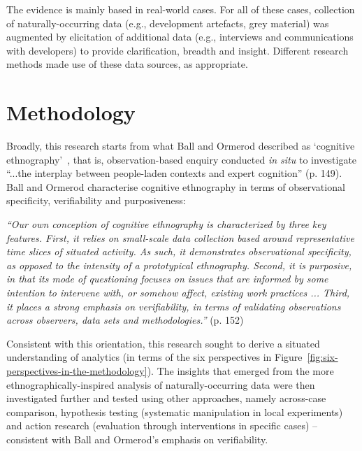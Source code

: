 The evidence is mainly based in real-world cases. For all of these cases, collection of naturally-occurring data (e.g., development artefacts, grey material) was augmented by elicitation of additional data (e.g., interviews and communications with developers) to provide clarification, breadth and insight.  Different research methods made use of these data sources, as appropriate.

\section{Methodology}
Broadly, this research starts from what Ball and Ormerod described as `cognitive ethnography'~\citep{ball2000_putting_ethnography_to_work_cognitive_ethnography}, that is, observation-based enquiry conducted \textit{in situ} to investigate ``...the interplay between people-laden contexts and expert cognition'' (p. 149). Ball and Ormerod characterise cognitive ethnography in terms of observational specificity, verifiability and purposiveness: 

\textit{``Our own conception of cognitive ethnography is characterized by three key features. First, it relies on small-scale data collection based around representative time slices of situated activity. As such, it demonstrates observational specificity, as opposed to the intensity of a prototypical ethnography. Second, it is purposive, in that its mode of questioning focuses on issues that are informed by some intention to intervene with, or somehow affect, existing work practices ... Third, it places a strong emphasis on verifiability, in terms of validating observations across observers, data sets and methodologies.''} (p. 152)

Consistent with this orientation, this research sought to derive a situated understanding of analytics (in terms of the six perspectives in Figure~\ref{fig:six-perspectives-in-the-methodology}). The insights that emerged from the more ethnographically-inspired analysis of naturally-occurring data were then investigated further and tested using other approaches, namely across-case comparison, hypothesis testing (systematic manipulation in local experiments) and action research (evaluation through interventions in specific cases) -- consistent with Ball and Ormerod's emphasis on verifiability.  


